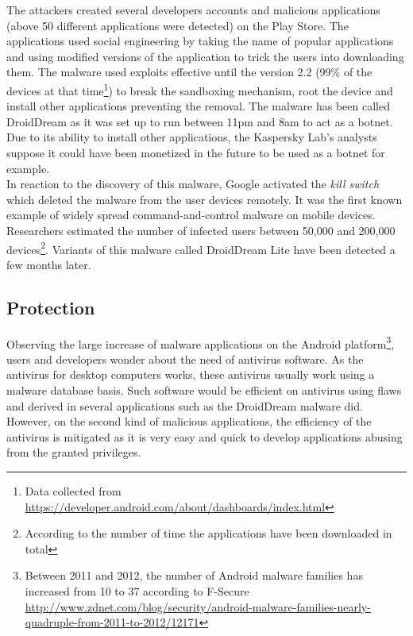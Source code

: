 The attackers created several developers accounts and malicious applications (above 50 different applications were detected) on the Play Store.
The applications used social engineering by taking the name of popular applications and using modified versions of the application to trick the users into downloading them.
The malware used exploits effective until the version 2.2 (99\% of the devices at that time\footnote{Data collected from \url{https://developer.android.com/about/dashboards/index.html}}) to break the sandboxing mechanism, root the device and install other applications preventing the removal.
The malware has been called DroidDream as it was set up to run between 11pm and 8am to act as a botnet.
Due to its ability to install other applications, the Kaspersky Lab's analysts suppose it could have been monetized in the future to be used as a botnet for example.\\

In reaction to the discovery of this malware, Google activated the \emph{kill switch} which deleted the malware from the user devices remotely.
It was the first known example of widely spread command-and-control malware on mobile devices.
Researchers estimated the number of infected users between 50,000 and 200,000 devices\footnote{According to the number of time the applications have been downloaded in total}.
Variants of this malware called DroidDream Lite have been detected a few months later.

\subsection{Protection}
Observing the large increase of malware applications on the Android platform\footnote{Between 2011 and 2012, the number of Android malware families has increased from 10 to 37 according to F-Secure \url{http://www.zdnet.com/blog/security/android-malware-families-nearly-quadruple-from-2011-to-2012/12171}}, users and developers wonder about the need of antivirus software.
As the antivirus for desktop computers works, these antivirus usually work using a malware database basis.
Such software would be efficient on antivirus using flaws and derived in several applications such as the DroidDream malware did.
However, on the second kind of malicious applications, the efficiency of the antivirus is mitigated as it is very easy and quick to develop applications abusing from the granted privileges.\\

